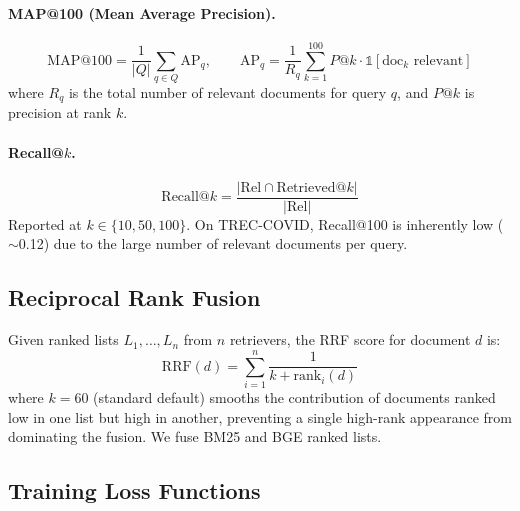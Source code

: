 \documentclass[12pt, a4paper]{article}
\newcommand{\tc}{TREC-COVID}
\begin{document}
\paragraph{MAP@100 (Mean Average Precision).}
\begin{equation}
  \text{MAP@100} = \frac{1}{|Q|} \sum_{q \in Q} \text{AP}_q, \qquad
  \text{AP}_q = \frac{1}{R_q} \sum_{k=1}^{100} P@k \cdot \mathbb{1}[\text{doc}_k\text{ relevant}]
  \label{eq:map}
\end{equation}
where $R_q$ is the total number of relevant documents for query $q$, and $P@k$
is precision at rank $k$.

\paragraph{Recall@$k$.}
\begin{equation}
  \text{Recall@}k = \frac{|\text{Rel} \cap \text{Retrieved@}k|}{|\text{Rel}|}
  \label{eq:recall}
\end{equation}
Reported at $k \in \{10, 50, 100\}$.  On \tc{}, Recall@100 is inherently low
($\sim$0.12) due to the large number of relevant documents per query.

\subsection{Reciprocal Rank Fusion}
\label{sec:rrf}

Given ranked lists $L_1, \ldots, L_n$ from $n$ retrievers, the RRF score for
document $d$ is:
\begin{equation}
  \text{RRF}(d) = \sum_{i=1}^{n} \frac{1}{k + \text{rank}_i(d)}
  \label{eq:rrf}
\end{equation}
where $k = 60$ (standard default) smooths the contribution of documents ranked
low in one list but high in another, preventing a single high-rank appearance
from dominating the fusion.  We fuse BM25 and BGE ranked lists.

\subsection{Training Loss Functions}
\label{sec:losses}
\end{document}
